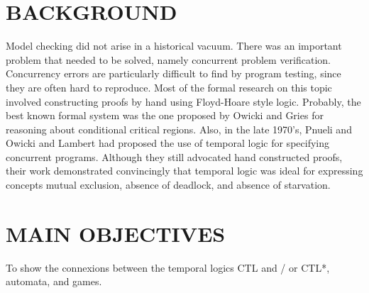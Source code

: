 \documentclass[12pt,letterpaper]{article}
\begin{document}
\section{BACKGROUND}
Model checking did not arise in a historical vacuum. There was an important problem that needed to be solved, namely concurrent problem verification. Concurrency errors are particularly difficult to find by program testing, since they are often hard to reproduce. Most of the formal research on this topic involved constructing proofs by hand using Floyd-Hoare style logic. Probably, the best known formal system was the one proposed by Owicki and Gries for reasoning about conditional critical regions.
Also, in the late 1970’s, Pnueli and Owicki and Lambert had proposed the use of temporal logic for specifying concurrent programs. Although they still advocated hand constructed proofs, their work demonstrated convincingly that temporal logic was ideal for expressing concepts mutual exclusion, absence of deadlock, and absence of starvation.

\section{MAIN OBJECTIVES}
 To show the connexions between the temporal logics CTL and / or CTL*, automata, and games.
\end{document}
